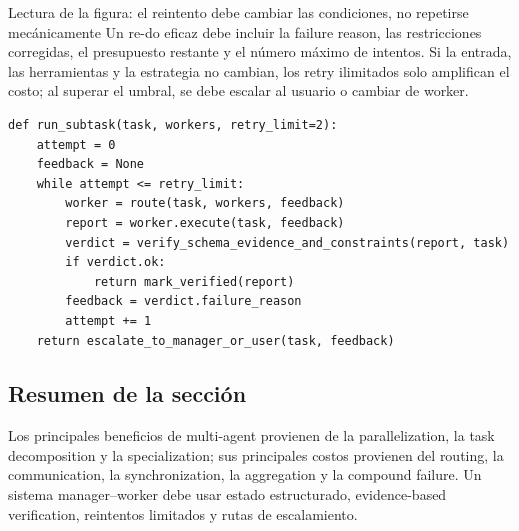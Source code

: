 \begin{knowledgebox}{Lectura de la figura: el reintento debe cambiar las condiciones, no repetirse mecánicamente}
Un re-do eficaz debe incluir la failure reason, las restricciones corregidas, el presupuesto restante y el número máximo de intentos. Si la entrada, las herramientas y la estrategia no cambian, los retry ilimitados solo amplifican el costo; al superar el umbral, se debe escalar al usuario o cambiar de worker.
\end{knowledgebox}

\begin{lstlisting}[caption={Protocolo manager--worker con verificación y reintentos limitados}]
def run_subtask(task, workers, retry_limit=2):
    attempt = 0
    feedback = None
    while attempt <= retry_limit:
        worker = route(task, workers, feedback)
        report = worker.execute(task, feedback)
        verdict = verify_schema_evidence_and_constraints(report, task)
        if verdict.ok:
            return mark_verified(report)
        feedback = verdict.failure_reason
        attempt += 1
    return escalate_to_manager_or_user(task, feedback)
\end{lstlisting}


\subsection{Resumen de la sección}

Los principales beneficios de multi-agent provienen de la parallelization, la task decomposition y la specialization; sus principales costos provienen del routing, la communication, la synchronization, la aggregation y la compound failure. Un sistema manager--worker debe usar estado estructurado, evidence-based verification, reintentos limitados y rutas de escalamiento.

